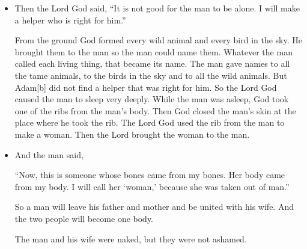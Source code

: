 \begin{itemize}
\item Then the Lord God said, “It is not good for the man to be alone. I will make a helper who is right for him.”

From the ground God formed every wild animal and every bird in the sky. He brought them to the man so the man could name them. Whatever the man called each living thing, that became its name. The man gave names to all the tame animals, to the birds in the sky and to all the wild animals. But Adam[b] did not find a helper that was right for him.  So the Lord God caused the man to sleep very deeply. While the man was asleep, God took one of the ribs from the man’s body. Then God closed the man’s skin at the place where he took the rib.  The Lord God used the rib from the man to make a woman. Then the Lord brought the woman to the man.

\item And the man said,

“Now, this is someone whose bones came from my bones.
    Her body came from my body.
I will call her ‘woman,’
    because she was taken out of man.”

So a man will leave his father and mother and be united with his wife. And the two people will become one body.

The man and his wife were naked, but they were not ashamed.
\end{itemize}

\newpage
